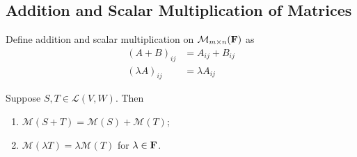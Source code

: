 \begin{comment}
That is,
\begin{align*}
Tv_1&=a_{11}w_1+a_{21}w_2+\cdots+a_{m1}w_m\\
Tv_2&=a_{12}w_1+a_{22}w_2+\cdots+a_{m2}w_m\\
&\vdots\\
Tv_n&=a_{1n}w_1+a_{2n}w_2+\cdots+a_{mn}w_m
\end{align*}

Thus we can write
\begin{align*}
\mathcal{M}(T)&=T\begin{pmatrix}
v_1&v_2&\cdots&v_n
\end{pmatrix}\\
&=\begin{pmatrix}
w_1&w_2&\cdots&w_m
\end{pmatrix}
\begin{pmatrix}
a_{11}&a_{12}&\cdots&a_{1n}\\
a_{21}&a_{22}&\cdots&a_{2n}\\
\vdots&\vdots&\ddots&\vdots\\
a_{m1}&a_{m2}&\cdots&a_{mn}
\end{pmatrix}\\
&=\begin{pmatrix}
\sum_{k=1}^{m}a_{k1}w_k & \cdots & \sum_{k=1}^{m}a_{kn}w_k
\end{pmatrix}
\end{align*}
\end{comment}
\pagebreak

\subsection{Addition and Scalar Multiplication of Matrices}
Define addition and scalar multiplication on $\mathcal{M}_{m\times n}(\mathbf F)$ as
\begin{align*}
(A+B)_{ij}&=A_{ij}+B_{ij}\\
(\lambda A)_{ij}&=\lambda A_{ij}
\end{align*}

\begin{lemma}
Suppose $S,T\in\mathcal{L}(V,W)$. Then
\begin{enumerate}[label=(\roman*)]
\item $\mathcal{M}(S+T)=\mathcal{M}(S)+\mathcal{M}(T)$;
\item $\mathcal{M}(\lambda T)=\lambda\mathcal{M}(T)$ for $\lambda\in\mathbf F$.
\end{enumerate}
\end{lemma}

